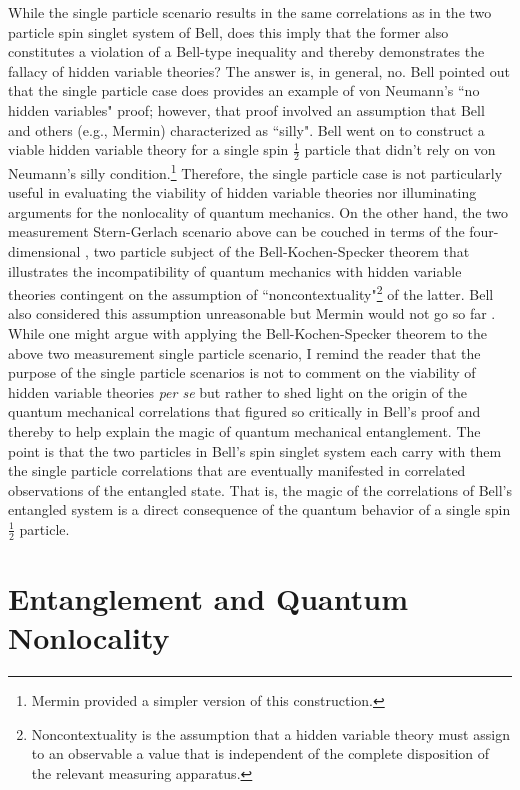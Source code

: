 \documentclass[12pt]{article}
\begin{document}
While the single particle scenario results in the same correlations as in the two particle spin singlet system of Bell, does this imply that the former also constitutes a violation of a Bell-type inequality and thereby demonstrates the fallacy of hidden variable theories?  The answer is, in general, no.  Bell \cite{Bel66} pointed out that the single particle case does provides an example of von Neumann's ``no hidden variables" proof; however, that proof involved an assumption that Bell and others (e.g., Mermin\cite{Mer93}) characterized as ``silly".  Bell went on to construct a viable hidden variable theory for a single spin $\frac{1}{2}$ particle that didn't rely on von Neumann's silly condition.\footnote{ Mermin \cite{Mer93} provided a simpler version of this construction.}  Therefore, the single particle case is not particularly useful in evaluating the viability of hidden variable theories nor illuminating arguments for the nonlocality of quantum mechanics.  On the other hand, the two measurement Stern-Gerlach scenario above can be couched in terms of the four-dimensional , two particle subject of the Bell-Kochen-Specker theorem\cite{Mer93} that illustrates the incompatibility of quantum mechanics with hidden variable theories contingent on the assumption of ``noncontextuality"\footnote{Noncontextuality is the assumption that a hidden variable theory must assign to an observable a value that is independent of the complete disposition of the relevant measuring apparatus.} of the latter.  Bell\cite{Bel66} also considered this assumption unreasonable but Mermin would not go so far \cite{Mer93}.  While one might argue with applying the Bell-Kochen-Specker theorem to the above two measurement single particle scenario, I remind the reader that the purpose of the single particle scenarios is not to comment on the viability of hidden variable theories {\it per se} but rather to shed light on the origin of the quantum mechanical correlations that figured so critically in Bell's  proof and thereby to help explain the magic of quantum mechanical entanglement.  The point is that the two particles in Bell's spin singlet system each carry with them the single particle correlations that are eventually manifested in correlated observations of the entangled state. That is, the magic of 
the correlations of Bell's entangled system is a direct consequence of the quantum behavior of a single spin $\frac{1}{2}$ particle.

\section{Entanglement and Quantum Nonlocality}\label{EQN}
\end{document}
